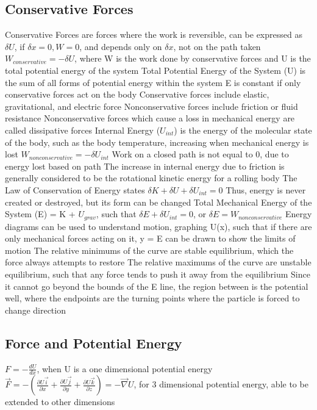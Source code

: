 \documentclass[11 pt, twoside]{article}
\newenvironment{outline*}
{
	\begin{outline}[enumerate]
	}
	{\end{outline}
}
\begin{document}
\subsection{Conservative Forces}
\begin{outline*}
\1 Conservative Forces are forces where the work is reversible, can be expressed as $\delta U$, if $\delta x = 0, W = 0$, and depends only on $\delta x$, not on the path taken
\2 $W_{conservative} = -\delta U$, where W is the work done by conservative forces and U is the total potential energy of the system
\2 Total Potential Energy of the System (U) is the sum of all forms of potential energy within the system
\2 E is constant if only conservative forces act on the body
\2 Conservative forces include elastic, gravitational, and electric force
\1 Nonconservative forces include friction or fluid resistance
\2 Nonconservative forces which cause a loss in mechanical energy are called dissipative forces
\1 Internal Energy ($U_{int}$) is the energy of the molecular state of the body, such as the body temperature, increasing when mechanical energy is lost
\2 $W_{nonconservative} = -\delta U_{int}$
\2 Work on a closed path is not equal to 0, due to energy lost based on path
\2 The increase in internal energy due to friction is generally considered to be the rotational kinetic energy for a rolling body
\1 The Law of Conservation of Energy states $\delta K + \delta U + \delta U_{int} = 0$
\2 Thus, energy is never created or destroyed, but its form can be changed
\2 Total Mechanical Energy of the System (E) = K + $U_{grav}$, such that $\delta E + \delta U_{int} = 0$, or $\delta E = W_{nonconservative}$
\1 Energy diagrams can be used to understand motion, graphing U(x), such that if there are only mechanical forces acting on it, y = E can be drawn to show the limits of motion
\2 The relative minimums of the curve are stable equilibrium, which the force always attempts to restore
\2 The relative maximums of the curve are unstable equilibrium, such that any force tends to push it away from the equilibrium
\2 Since it cannot go beyond the bounds of the E line, the region between is the potential well, where the endpoints are the turning points where the particle is forced to change direction
\end{outline*}
\subsection{Force and Potential Energy}
\begin{outline*}
\1 $F = -\frac{dU}{dx}$, when U is a one dimensional potential energy
\1 $\vec{F} = -(\frac{\partial U\vec{i}}{\partial x} + \frac{\partial U\vec{j}}{\partial y} + \frac{\partial U\vec{k}}{\partial z}) = -\vec{\nabla}U$, for 3 dimensional potential energy, able to be extended to other dimensions
\end{outline*}
\end{document}
